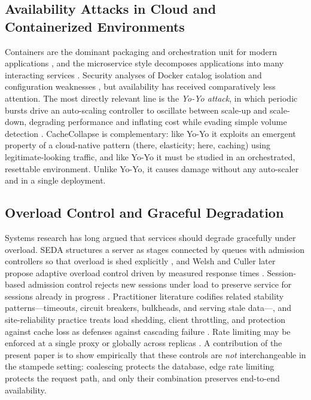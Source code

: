 \subsection{Availability Attacks in Cloud and Containerized Environments}
Containers are the dominant packaging and orchestration unit for modern applications
\cite{pahl2015,merkel2014,burns2016}, and the microservice style decomposes
applications into many interacting services \cite{dragoni2017}. Security analyses of
Docker catalog isolation and configuration weaknesses \cite{combe2016,sultan2019}, but
availability has received comparatively less attention. The most directly relevant
line is the \emph{Yo-Yo attack}, in which periodic bursts drive an auto-scaling
controller to oscillate between scale-up and scale-down, degrading performance and
inflating cost while evading simple volume detection \cite{sides2016,bremlerbarr2017}.
CacheCollapse is complementary: like Yo-Yo it exploits an emergent property of a
cloud-native pattern (there, elasticity; here, caching) using legitimate-looking
traffic, and like Yo-Yo it must be studied in an orchestrated, resettable environment.
Unlike Yo-Yo, it causes damage without any auto-scaler and in a single deployment.

\subsection{Overload Control and Graceful Degradation}
Systems research has long argued that services should degrade gracefully under
overload. SEDA structures a server as stages connected by queues with admission
controllers so that overload is shed explicitly \cite{welsh2001}, and Welsh and Culler
later propose adaptive overload control driven by measured response times
\cite{welsh2003}. Session-based admission control rejects new sessions under load to
preserve service for sessions already in progress \cite{cherkasova2002}. Practitioner
literature codifies related stability patterns---timeouts, circuit breakers, bulkheads,
and serving stale data---\cite{nygard2018}, and site-reliability practice treats load
shedding, client throttling, and protection against cache loss as defenses against
cascading failure \cite{beyer2016}. Rate limiting may be enforced at a single proxy or
globally across replicas \cite{raghavan2007}. A contribution of the present paper is to
show empirically that these controls are \emph{not} interchangeable in the stampede
setting: coalescing protects the database, edge rate limiting protects the request
path, and only their combination preserves end-to-end availability.

